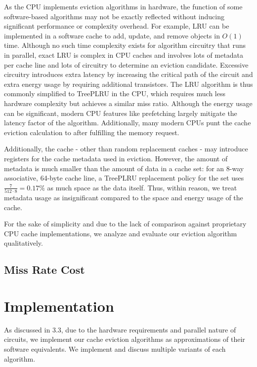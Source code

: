 As the CPU implements eviction algorithms in hardware, the function of some software-based algorithms
may not be exactly reflected without inducing significant performance or complexity overhead.
For example, LRU can be implemented in a software cache to add, update, and remove objects in $O(1)$ time.
Although no such time complexity exists for algorithm circuitry that runs in parallel,
exact LRU is complex in CPU caches and involves lots of metadata per cache line and lots of circuitry to
determine an eviction candidate.
Excessive circuitry introduces extra latency by increasing the critical path of the circuit
and extra energy usage by requiring additional transistors.
The LRU algorithm is thus commonly simplified to TreePLRU in the CPU, which requires much less hardware complexity
but achieves a similar miss ratio.
Although the energy usage can be significant, modern CPU features like prefetching largely mitigate the latency factor of the algorithm.
Additionally, many modern CPUs punt the cache eviction calculation to after fulfilling the memory request.

Additionally, the cache - other than random replacement caches - may introduce registers for the cache metadata used in eviction.
However, the amount of metadata is much smaller than the amount of data in a cache set:
for an 8-way associative, 64-byte cache line, a TreePLRU replacement policy for the set uses
$\frac{7}{512 \cdot 8}=0.17\%$ as much space as the data itself.
Thus, within reason, we treat metadata usage as insignificant compared to the space and energy usage of the cache.

For the sake of simplicity and due to the lack of comparison against proprietary CPU cache implementations,
we analyze and evaluate our eviction algorithm qualitatively.

\subsection{Miss Rate Cost}

\section{Implementation}

As discussed in 3.3, due to the hardware requirements and parallel nature of circuits,
we implement our cache eviction algorithms as approximations of their software equivalents.
We implement and discuss multiple variants of each algorithm.

